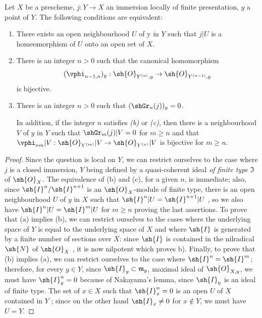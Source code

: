 \begin{proposition}[16.1.9]
\label{IV.16.1.9}
Let $X$ be a prescheme, $j: Y \to X$ an immersion locally of finite presentation, $y$ a point of $Y$. The following conditions are equivalent:
\begin{enumerate}
  \item[(a)] There exists an open neighbourhood $U$ of y in $Y$ such that $j|U$ is a homeomorphism of $U$ onto an open set of $X$.
  \item[(b)] There is an integer $n>0$ such that the canonical homomorphism
  \[
    (\vphi_{n-1,n})_y: \sh{O}_{Y^{(n)},y} \to \sh{O}_{Y^{(n-1)},y}
  \]
  is bijective.
  \item[(c)] There is an integer $n>0$ such that $(\shGr_n(j))_y = 0$.
  
  In addition, if the integer $n$ satisfies \emph{(b)} or \emph{(c)}, then there is a neighbourhood $V$ of $y$ in $Y$ such that $\shGr_m(j)|V = 0$ for $m \geq n$ and that $\vphi_{nm}|V: \sh{O}_{Y^{(m)}}|V \to \sh{O}_{Y^{(n)}}|V$ is bijective for $m \geq n$. 
\end{enumerate}
\end{proposition}

\begin{proof}
Since the question is local on $Y$, we can restrict ourselves to the case where $j$ is a closed immersion, $Y$ being defined by a quasi-coherent ideal \emph{of finite type} $\mathfrak{I}$ of $\sh{O}_X$.
The equivalence of (b) and (c), for a given $n$, is immediate;
also, since $\sh{I}^n/\sh{I}^{n+1}$ is an $\sh{O}_X$-module of finite type, there is an open neighbourhood $U$ of $y$ in $X$ such that $\sh{I}^n|U = \sh{I}^{n+1}|U$ , so we also have $\sh{I}^n|U = \sh{I}^m|U$ for $m \geq n$ proving the last assertions.
To prove that (a) implies (b), we can restrict ourselves to the cases where the underlying space of $Y$ is equal to the underlying space of $X$ and where $\sh{I}$ is generated by a finite number of sections over $X$:
since $\sh{I}$ is contained in the nilradical $\sh{N}$ of $\sh{O}_X$ , it is now nilpotent which proves b).
Finally, to prove that (b) implies (a), we can restrict ourselves to the case where $\sh{I}^n = \sh{I}^m$; 
therefore, for every $y \in Y$, since $\sh{I}_y \subset \mathfrak{m}_y$, maximal ideal of $\sh{O}_{X,y}$, we must have $\sh{I}^n_y = 0$ because of Nakayama's lemma, since $\sh{I}_y$ is an ideal of finite type.
The set of $x \in X$ such that $\sh{I}^n_x = 0$ is an open $U$ of $X$ contained in $Y$ ;
since on the other hand $\sh{I}_x \neq 0$ for $x \notin Y$, we must have $U = Y$.
\end{proof}

